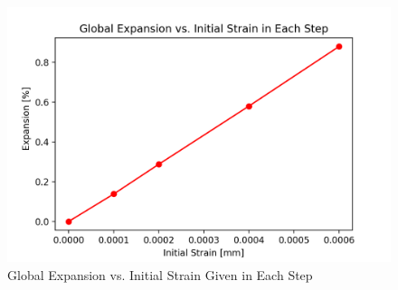 \begin{figure}[ht!]
\centering
\includegraphics[width=.8\linewidth]{Files/exp_plot/DEFA30X0C_exp.png}
  \caption{Global Expansion vs. Initial Strain Given in Each Step}
  \label{fig:DEFA30X0C_exdfdsp}
\end{figure}

